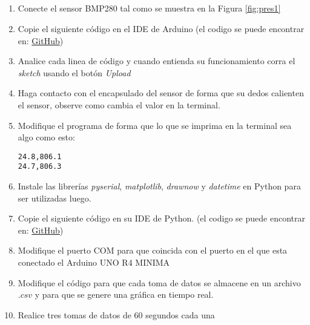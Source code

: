 \subsection{\pro}
\begin{enumerate}
    \item Conecte el sensor BMP280 tal como se muestra en la Figura \ref{fig:pres1}
    \item Copie el siguiente código en el IDE de Arduino (el codigo se puede encontrar en: \href{https://github.com/juanjorojash/instrumentacion_I/blob/master/algoritmos/BMP280/BMP280_lib/BMP280_lib.ino}{GitHub})
      
    \item Analice cada linea de código y cuando entienda su funcionamiento corra el \emph{sketch} usando el botón \emph{Upload}
    \item Haga contacto con el encapsulado del sensor de forma que su dedos calienten el sensor, observe como cambia el valor en la terminal. 
    \item Modifique el programa de forma que lo que se imprima en la terminal sea algo como esto:
\begin{verbatim}
24.8,806.1
24.7,806.3
\end{verbatim}
    \item Instale las librerías \emph{pyserial}, \emph{matplotlib}, \emph{drawnow} y \emph{datetime} en Python para ser utilizadas luego.
    \item Copie el siguiente código en su IDE de Python. (el codigo se puede encontrar en: \href{https://github.com/juanjorojash/instrumentacion_I/blob/master/algoritmos/BMP280/BMP280_lib/serial_read.py}{GitHub})
    
    \item Modifique el puerto COM para que coincida con el puerto en el que esta conectado el Arduino UNO R4 MINIMA
    \item Modifique el código para que cada toma de datos se almacene en un archivo $.csv$ y para que se genere una gráfica en tiempo real.
    \item Realice tres tomas de datos de 60 segundos cada una
\end{enumerate}

